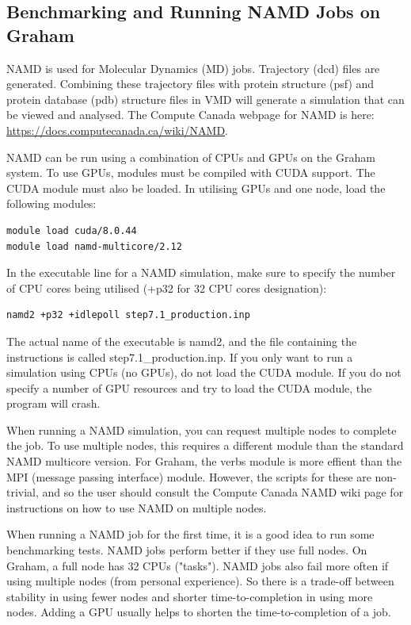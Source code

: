 \documentclass[12pt]{article}
\begin{document}
\subsection{Benchmarking and Running NAMD Jobs on Graham}

\quad NAMD is used for Molecular Dynamics (MD) jobs. Trajectory (dcd) files are generated. Combining these trajectory files with protein structure (psf) and protein database (pdb) structure files in VMD will generate a simulation that can be viewed and analysed. The Compute Canada webpage for NAMD is here: \url{https://docs.computecanada.ca/wiki/NAMD}. 

\quad NAMD can be run using a combination of CPUs and GPUs on the Graham system. To use GPUs, modules must be compiled with CUDA support. The CUDA module must also be loaded. In utilising GPUs and one node, load the following modules:

\begin{lstlisting}[numbers=none]
module load cuda/8.0.44
module load namd-multicore/2.12
\end{lstlisting}

\quad In the executable line for a NAMD simulation, make sure to specify the number of CPU cores being utilised (+p32 for 32 CPU cores designation):

\begin{lstlisting}[numbers=none]
namd2 +p32 +idlepoll step7.1_production.inp
\end{lstlisting}

\quad The actual name of the executable is namd2, and the file containing the instructions is called step7.1\_production.inp. If you only want to run a simulation using CPUs (no GPUs), do not load the CUDA module. If you do not specify a number of GPU resources and try to load the CUDA module, the program will crash. 

\quad When running a NAMD simulation, you can request multiple nodes to complete the job. To use multiple nodes, this requires a different module than the standard NAMD multicore version. For Graham, the verbs module is more effient than the MPI (message passing interface) module. However, the scripts for these are non-trivial, and so the user should consult the Compute Canada NAMD wiki page for instructions on how to use NAMD on multiple nodes.

\quad When running a NAMD job for the first time, it is a good idea to run some benchmarking tests. NAMD jobs perform better if they use full nodes. On Graham, a full node has 32 CPUs ("tasks"). NAMD jobs also fail more often if using multiple nodes (from personal experience). So there is a trade-off between stability in using fewer nodes and shorter time-to-completion in using more nodes. Adding a GPU usually helps to shorten the time-to-completion of a job.
\end{document}
